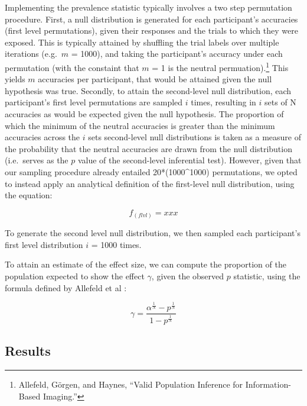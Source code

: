 \documentclass[
  12pt,
]{article}
\begin{document}
Implementing the prevalence statistic typically involves a two step permutation procedure. First, a null distribution is generated for each participant's accuracies (first level permutations), given their responses and the trials to which they were exposed. This is typically attained by shuffling the trial labels over multiple iterations (e.g.~\(m\) = 1000), and taking the participant's accuracy under each permutation (with the constaint that \(m\) = 1 is the neutral permuation).\footnote{Allefeld, Görgen, and Haynes, ``Valid Population Inference for Information-Based Imaging.''} This yields \(m\) accuracies per participant, that would be attained given the null hypothesis was true. Secondly, to attain the second-level null distribution, each participant's first level permutations are sampled \(i\) times, resulting in \(i\) sets of N accuracies as would be expected given the null hypothesis. The proportion of which the minimum of the neutral accuracies is greater than the minimum accuracies across the \(i\) sets second-level null distributions is taken as a measure of the probability that the neutral accuracies are drawn from the null distribution (i.e.~serves as the \(p\) value of the second-level inferential test). However, given that our sampling procedure already entailed 20*(1000\^{}1000) permutations, we opted to instead apply an analytical definition of the first-level null distribution, using the equation:

\[f_{(flvl)} = xxx \]

To generate the second level null distribution, we then sampled each participant's first level distribution \(i\) = 1000 times.

To attain an estimate of the effect size, we can compute the proportion of the population expected to show the effect \(\gamma\), given the observed \(p\) statistic, using the formula defined by Allefeld et al :

\[\gamma = \frac{\alpha^\frac{1}{N} - p^\frac{1}{N}}{1-p^\frac{1}{N}}\]

\hypertarget{results}{%
\subsection*{Results}\label{results}}
\end{document}
